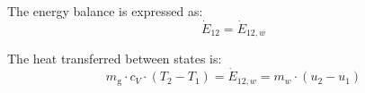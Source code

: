 The energy balance is expressed as:  
\[
\dot{E}_{12} = \dot{E}_{12,w}
\]  

The heat transferred between states is:  
\[
m_{\text{g}} \cdot c_V \cdot (T_2 - T_1) = \dot{E}_{12,w} = m_w \cdot (u_2 - u_1)
\]
